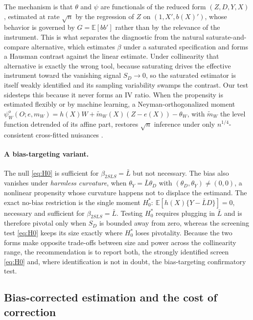 \documentclass[11pt]{article}
\theoremstyle{plain}
\theoremstyle{definition}
\newcommand{\E}{\mathbb{E}}
\newcommand{\Lb}{\bar{L}}
\begin{document}
The mechanism is that $\theta$ and $\psi$ are functionals of the reduced form $(Z,D,Y,X)$, estimated at rate $\sqrt{n}$ by the regression of $Z$ on $(1,X',b(X)')$, whose behavior is governed by $G=\E[bb']$ rather than by the relevance of the instrument. This is what separates the diagnostic from the natural saturate-and-compare alternative, which estimates $\beta$ under a saturated specification and forms a Hausman contrast against the linear estimate. Under collinearity that alternative is exactly the wrong tool, because saturating drives the effective instrument toward the vanishing signal $S_D\to 0$, so the saturated estimator is itself weakly identified and its sampling variability swamps the contrast. Our test sidesteps this because it never forms an IV ratio. When the propensity is estimated flexibly or by machine learning, a Neyman-orthogonalized moment $\psi^o_W(O;e,m_W)=h(X)W+\tilde m_W(X)(Z-e(X))-\theta_W$, with $\tilde m_W$ the level function detrended of its affine part, restores $\sqrt{n}$ inference under only $n^{1/4}$-consistent cross-fitted nuisances \citep{cchd+2018}.

\paragraph{A bias-targeting variant.} The null \eqref{eq:H0} is sufficient for $\beta_{2SLS}=\Lb$ but not necessary. The bias also vanishes under \emph{harmless curvature}, when $\theta_Y=\Lb\theta_D$ with $(\theta_D,\theta_Y)\neq(0,0)$, a nonlinear propensity whose curvature happens not to displace the estimand. The exact no-bias restriction is the single moment $H_0^\ast:\ \E[h(X)\{Y-\Lb D\}]=0$, necessary and sufficient for $\beta_{2SLS}=\Lb$. Testing $H_0^\ast$ requires plugging in $\Lb$ and is therefore pivotal only when $S_D$ is bounded away from zero, whereas the screening test \eqref{eq:H0} keeps its size exactly where $H_0^\ast$ loses pivotality. Because the two forms make opposite trade-offs between size and power across the collinearity range, the recommendation is to report both, the strongly identified screen \eqref{eq:H0} and, where identification is not in doubt, the bias-targeting confirmatory test.

\subsection{Bias-corrected estimation and the cost of correction}\label{sec:correct}
\end{document}
